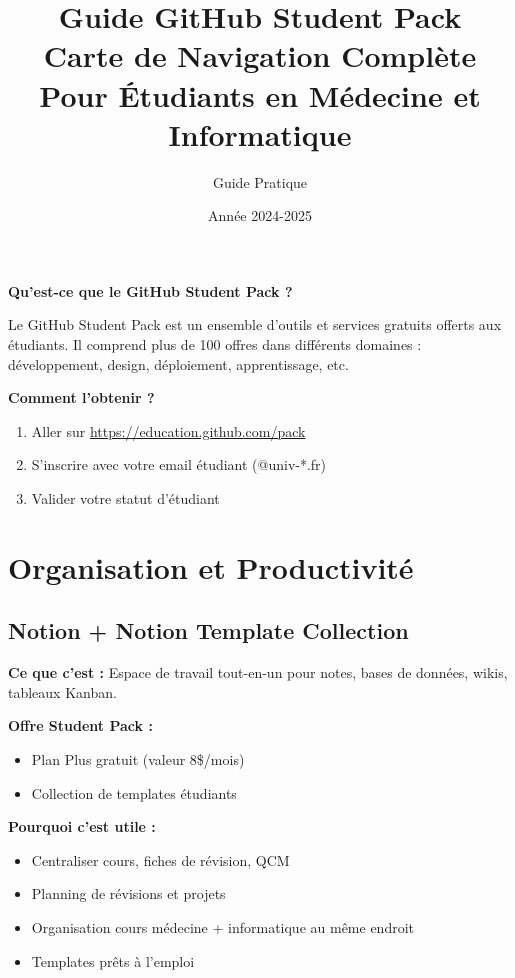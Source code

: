 \documentclass[11pt,a4paper]{article}
\title{\textbf{\Huge\color{titrebleu}Guide GitHub Student Pack}\\[0.5em]
\large\color{defvert}Carte de Navigation Complète\\
Pour Étudiants en Médecine et Informatique}
\author{\large Guide Pratique}
\date{\large Année 2024-2025}
\begin{document}
\maketitle

\begin{info}
\textbf{Qu'est-ce que le GitHub Student Pack ?}

Le GitHub Student Pack est un ensemble d'outils et services gratuits offerts aux étudiants. Il comprend plus de 100 offres dans différents domaines : développement, design, déploiement, apprentissage, etc.

\textbf{Comment l'obtenir ?}
\begin{enumerate}
    \item Aller sur \url{https://education.github.com/pack}
    \item S'inscrire avec votre email étudiant (@univ-*.fr)
    \item Valider votre statut d'étudiant
\end{enumerate}
\end{info}

\tableofcontents
\newpage

\section{Organisation et Productivité}

\subsection{Notion + Notion Template Collection}

\textbf{Ce que c'est :} Espace de travail tout-en-un pour notes, bases de données, wikis, tableaux Kanban.

\textbf{Offre Student Pack :}
\begin{itemize}
    \item Plan Plus gratuit (valeur 8\$/mois)
    \item Collection de templates étudiants
\end{itemize}

\textbf{Pourquoi c'est utile :}
\begin{itemize}
    \item Centraliser cours, fiches de révision, QCM
    \item Planning de révisions et projets
    \item Organisation cours médecine + informatique au même endroit
    \item Templates prêts à l'emploi
\end{itemize}
\end{document}
